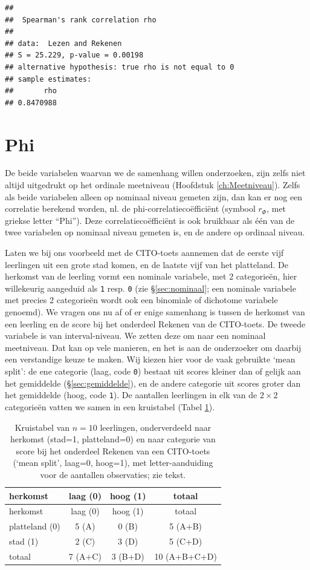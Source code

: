 \documentclass[
]{book}
\begin{document}
\begin{verbatim}
## 
##  Spearman's rank correlation rho
## 
## data:  Lezen and Rekenen
## S = 25.229, p-value = 0.00198
## alternative hypothesis: true rho is not equal to 0
## sample estimates:
##       rho 
## 0.8470988
\end{verbatim}

\hypertarget{sec:Phi}{%
\section{Phi}\label{sec:Phi}}

De beide variabelen waarvan we de samenhang willen onderzoeken, zijn
zelfs niet altijd uitgedrukt op het ordinale meetniveau
(Hoofdstuk \ref{ch:Meetniveau}). Zelfs als beide variabelen alleen op
nominaal niveau gemeten zijn, dan kan er nog een correlatie berekend
worden, nl. de phi-correlatiecoëfficiënt (symbool \(r_\Phi\), met griekse
letter ``Phi''). Deze correlatiecoëfficiënt is ook bruikbaar als één van
de twee variabelen op nominaal niveau gemeten is, en de andere op
ordinaal niveau.

Laten we bij ons voorbeeld met de CITO-toets aannemen dat de eerste vijf
leerlingen uit een grote stad komen, en de laatste vijf van het
platteland. De herkomst van de leerling vormt een nominale variabele,
met 2 categorieën, hier willekeurig aangeduid als \texttt{1} resp. \texttt{0} (zie
§\ref{sec:nominaal}; een nominale variabele met precies 2
categorieën wordt ook een binomiale of dichotome variabele genoemd). We
vragen ons nu af of er enige samenhang is tussen de herkomst van een
leerling en de score bij het onderdeel Rekenen van de CITO-toets. De
tweede variabele is van interval-niveau. We zetten deze om naar een
nominaal meetniveau. Dat kan op vele manieren, en het is aan de
onderzoeker om daarbij een verstandige keuze te maken. Wij kiezen hier
voor de vaak gebruikte `mean split': de ene categorie (laag, code \texttt{0})
bestaat uit scores kleiner dan of gelijk aan het gemiddelde
(§\ref{sec:gemiddelde}), en de andere categorie uit scores groter
dan het gemiddelde (hoog, code \texttt{1}). De aantallen leerlingen in elk van
de \(2\times 2\) categorieën vatten we samen in een kruistabel
(Tabel \ref{tab:cito-kruis}).

\begin{longtable}[]{@{}lccc@{}}
\caption{\label{tab:cito-kruis} Kruistabel van \(n=10\) leerlingen, onderverdeeld naar herkomst
(stad=1, platteland=0) en naar categorie van score bij het onderdeel Rekenen van een
CITO-toets (`mean split', laag=0, hoog=1), met letter-aanduiding voor de aantallen
observaties; zie tekst.}\tabularnewline
\toprule
herkomst & laag (0) & hoog (1) & totaal\tabularnewline
\midrule
\endfirsthead
\toprule
herkomst & laag (0) & hoog (1) & totaal\tabularnewline
\midrule
\endhead
platteland (0) & 5 (A) & 0 (B) & 5 (A+B)\tabularnewline
stad (1) & 2 (C) & 3 (D) & 5 (C+D)\tabularnewline
totaal & 7 (A+C) & 3 (B+D) & 10 (A+B+C+D)\tabularnewline
\bottomrule
\end{longtable}
\end{document}
